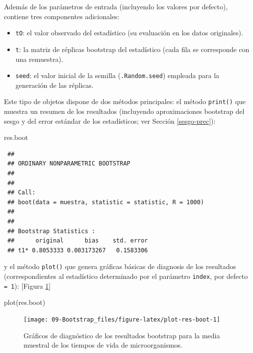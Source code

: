 \documentclass[
]{book}
\newenvironment{Shaded}{\begin{snugshade}}{\end{snugshade}}
\newcommand{\FunctionTok}[1]{\textcolor[rgb]{0.00,0.00,0.00}{#1}}
\newcommand{\NormalTok}[1]{#1}
\theoremstyle{break}
\theoremstyle{nonumberplain}
\begin{document}
Además de los parámetros de entrada (incluyendo los valores por defecto), contiene tres componentes adicionales:

\begin{itemize}
\item
  \texttt{tO}: el valor observado del estadístico
  (su evaluación en los datos originales).
\item
  \texttt{t}: la matriz de réplicas bootstrap del estadístico
  (cada fila se corresponde con una remuestra).
\item
  \texttt{seed}: el valor inicial de la semilla (\texttt{.Random.seed})
  empleada para la generación de las réplicas.
\end{itemize}

Este tipo de objetos dispone de dos métodos principales:
el método \texttt{print()} que muestra un resumen de los resultados
(incluyendo aproximaciones bootstrap del sesgo y del error
estándar de los estadísticos; ver Sección \ref{sesgo-prec}):

\begin{Shaded}
\begin{Highlighting}[]
\NormalTok{res.boot}
\end{Highlighting}
\end{Shaded}

\begin{verbatim}
 ## 
 ## ORDINARY NONPARAMETRIC BOOTSTRAP
 ## 
 ## 
 ## Call:
 ## boot(data = muestra, statistic = statistic, R = 1000)
 ## 
 ## 
 ## Bootstrap Statistics :
 ##      original      bias    std. error
 ## t1* 0.8053333 0.003173267   0.1583306
\end{verbatim}

y el método \texttt{plot()} que genera gráficas básicas de diagnosis
de los resultados (correspondientes al estadístico determinado por el parámetro \texttt{index}, por defecto \texttt{=\ 1}): {[}Figura \ref{fig:plot-res-boot}{]}

\begin{Shaded}
\begin{Highlighting}[]
\FunctionTok{plot}\NormalTok{(res.boot)}
\end{Highlighting}
\end{Shaded}

\begin{figure}[!htb]

{\centering \texttt{[image: 09-Bootstrap\_files/figure-latex/plot-res-boot-1]} 

}

\caption{Gráficos de diagnóstico de los resultados bootstrap para la media muestral de los tiempos de vida de microorganismos.}\label{fig:plot-res-boot}
\end{figure}
\end{document}
